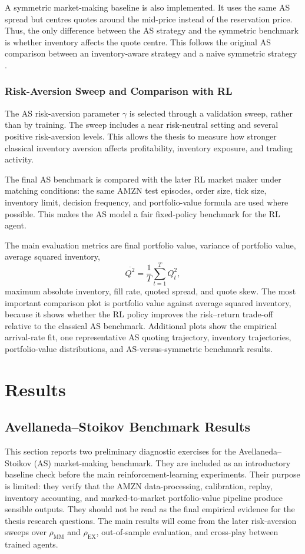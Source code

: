\documentclass[oneside]{uva-inf-bachelor-thesis}
\begin{document}
A symmetric market-making baseline is also implemented. It uses the same AS spread
but centres quotes around the mid-price instead of the reservation price. Thus, the
only difference between the AS strategy and the symmetric benchmark is whether
inventory affects the quote centre. This follows the original AS comparison between
an inventory-aware strategy and a naive symmetric strategy \cite{avellaneda_high-frequency_2008}.

\subsection{Risk-Aversion Sweep and Comparison with RL}

The AS risk-aversion parameter \(\gamma\) is selected through a validation sweep,
rather than by training. The sweep includes a near risk-neutral setting and several
positive risk-aversion levels. This allows the thesis to measure how stronger classical
inventory aversion affects profitability, inventory exposure, and trading activity.

The final AS benchmark is compared with the later RL market maker under matching
conditions: the same AMZN test episodes, order size, tick size, inventory limit,
decision frequency, and portfolio-value formula are used where possible. This makes
the AS model a fair fixed-policy benchmark for the RL agent.

The main evaluation metrics are final portfolio value, variance of portfolio value,
average squared inventory,
\[
    \overline{Q^2}
    =
    \frac{1}{T}
    \sum_{t=1}^{T} Q_t^2,
\]
maximum absolute inventory, fill rate, quoted spread, and quote skew. The most
important comparison plot is portfolio value against average squared inventory,
because it shows whether the RL policy improves the risk--return trade-off relative
to the classical AS benchmark. Additional plots show the empirical arrival-rate fit,
one representative AS quoting trajectory, inventory trajectories, portfolio-value
distributions, and AS-versus-symmetric benchmark results.


\chapter{Results}
\section{Avellaneda--Stoikov Benchmark Results}
\label{sec:as-results}
This section reports two preliminary diagnostic exercises for the Avellaneda--Stoikov (AS) market-making benchmark. They are included as an introductory baseline check before the main reinforcement-learning experiments. Their purpose is limited: they verify that the AMZN data-processing, calibration, replay, inventory accounting, and marked-to-market portfolio-value pipeline produce sensible outputs. They should not be read as the final empirical evidence for the thesis research questions. The main results will come from the later risk-aversion sweeps over $\rho_{\mathrm{MM}}$ and $\rho_{\mathrm{EX}}$, out-of-sample evaluation, and cross-play between trained agents.
\end{document}
